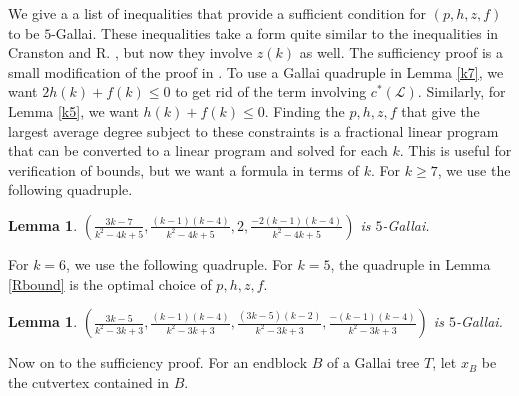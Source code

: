 \documentclass[10pt]{article}
\theoremstyle{plain}
\newtheorem{lem}[thm]{Lemma}
\theoremstyle{definition}
\theoremstyle{remark}
\newcommand{\fancy}[1]{\mathcal{#1}}
\renewcommand{\L}{\fancy{L}}
\newcommand{\parens}[1]{\left( #1 \right)}
\begin{document}
We give a a list of inequalities that provide a sufficient condition for $(p,h,z,f)$ to be $5$-Gallai.  
These inequalities take a form quite similar to the inequalities in Cranston and R. \cite{DischargingLowerBound}, but now
they involve $z(k)$ as well.   The sufficiency proof is a small modification of the proof in \cite{DischargingLowerBound}. 
To use a Gallai quadruple in Lemma \ref{k7}, we want $2h(k) + f(k) \le 0$ to get rid of the term involving $c^*(\L)$.  Similarly,
for Lemma \ref{k5}, we want $h(k) + f(k) \le 0$.   Finding the $p,h,z,f$ that give the largest average degree subject to these constraints
is a fractional linear program that can be converted to a linear program and solved for each $k$.  This is useful
for verification of bounds, but we want a formula in terms of $k$.  For $k \ge 7$, we use the following quadruple.

\begin{lem}\label{Gallai7Up}
$\parens{\frac{3k-7}{k^2-4k+5}, \frac{(k-1)(k-4)}{k^2-4k+5}, 2, \frac{-2(k-1)(k-4)}{k^2-4k+5}}$ is $5$-Gallai.
\end{lem}

\noindent For $k=6$, we use the following quadruple.  For $k=5$, the quadruple in Lemma \ref{Rbound} is the optimal choice of $p,h,z,f$.

\begin{lem}\label{Gallai6Up}
$\parens{\frac{3k-5}{k^2-3k+3}, \frac{(k-1)(k-4)}{k^2-3k+3}, \frac{(3k-5)(k-2)}{k^2-3k+3}, \frac{-(k-1)(k-4)}{k^2-3k+3}}$ is $5$-Gallai.
\end{lem}

\noindent Now on to the sufficiency proof.  For an endblock $B$ of a Gallai tree $T$, let $x_B$ be the cutvertex contained in $B$.
\end{document}
